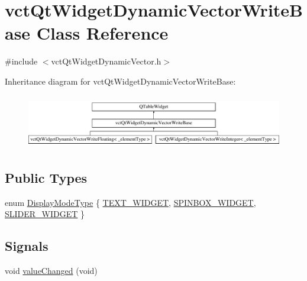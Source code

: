 \hypertarget{classvct_qt_widget_dynamic_vector_write_base}{\section{vct\-Qt\-Widget\-Dynamic\-Vector\-Write\-Base Class Reference}
\label{classvct_qt_widget_dynamic_vector_write_base}
}


{\ttfamily \#include $<$vct\-Qt\-Widget\-Dynamic\-Vector.\-h$>$}

Inheritance diagram for vct\-Qt\-Widget\-Dynamic\-Vector\-Write\-Base\-:\begin{figure}[H]
\begin{center}
\leavevmode
\includegraphics[height=2.393162cm]{d5/d5d/classvct_qt_widget_dynamic_vector_write_base}
\end{center}
\end{figure}
\subsection*{Public Types}
\begin{DoxyCompactItemize}
\item 
enum \hyperlink{classvct_qt_widget_dynamic_vector_write_base_aefbf6a51f1009f060305c2b5e106cf02}{Display\-Mode\-Type} \{ \hyperlink{classvct_qt_widget_dynamic_vector_write_base_aefbf6a51f1009f060305c2b5e106cf02aa84e1bae39afe989e862b07258d0889e}{T\-E\-X\-T\-\_\-\-W\-I\-D\-G\-E\-T}, 
\hyperlink{classvct_qt_widget_dynamic_vector_write_base_aefbf6a51f1009f060305c2b5e106cf02ad22827225b00f1d8c44f7262d5a79d37}{S\-P\-I\-N\-B\-O\-X\-\_\-\-W\-I\-D\-G\-E\-T}, 
\hyperlink{classvct_qt_widget_dynamic_vector_write_base_aefbf6a51f1009f060305c2b5e106cf02ac4575729771466ec484101d1b87e7301}{S\-L\-I\-D\-E\-R\-\_\-\-W\-I\-D\-G\-E\-T}
 \}
\end{DoxyCompactItemize}
\subsection*{Signals}
\begin{DoxyCompactItemize}
\item 
void \hyperlink{classvct_qt_widget_dynamic_vector_write_base_abf2117ff3315c479e88f20ca1a1cf6da}{value\-Changed} (void)
\end{DoxyCompactItemize}
